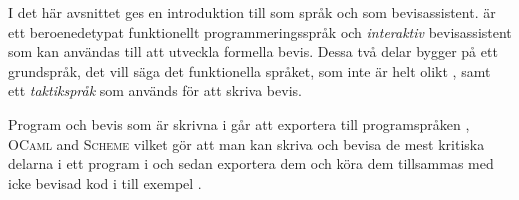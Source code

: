 I det här avsnittet ges en introduktion till \coq{} som språk och som
bevisassistent. \coq{} är ett beroenedetypat funktionellt programmeringsspråk och
\emph{interaktiv} bevisassistent som kan användas till att utveckla formella
bevis. Dessa två delar bygger på ett grundspråk, det vill säga det funktionella
språket, som inte är helt olikt \haskell{}, samt ett \emph{taktikspråk}
som används för att skriva bevis.

Program och bevis som är skrivna i \coq{} går att exportera till programspråken
\haskell{}, \textsc{OCaml} and \textsc{Scheme} vilket gör att man kan skriva och
bevisa de mest kritiska delarna i ett program i \coq{} och sedan exportera dem
och köra dem tillsammas med icke bevisad kod i till exempel \haskell{}.
